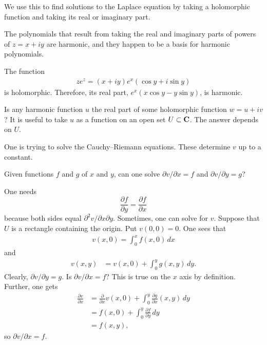 \documentclass[11pt, oneside,margin=1in]{article}
\begin{document}
We use this to find solutions to the Laplace equation by taking a holomorphic function and taking its real or imaginary part.
\begin{example}\label{}\text{}
The polynomials that result from taking the real and imaginary parts of powers of $z = x+iy$ are harmonic, and they happen to be a basis for harmonic polynomials.
\end{example}

\begin{example}[ ]\label{}\text{}
The function
\begin{align*}
	ze^z = (x+iy)e^x (\cos y + i\sin y)
\end{align*}
is holomorphic. Therefore, its real part, $e^x(x\cos y - y\sin y)$, is harmonic.
\end{example}

Is any harmonic function $u$ the real part of some holomorphic function $w = u+iv$? It is useful to take $u$ as a function on an open set $U\subset \mathbf C$. The answer depends on $U$. 

One is trying to solve the Cauchy--Riemann equations. These determine $v$ up to a constant. 

\begin{problem}
	Given functions $f$ and $g$ of $x$ and $y$, can one solve $\partial v/\partial x = f$ and $\partial v/\partial y = g$?
\end{problem}

One needs
\[
	\frac{\partial f}{\partial y} = \frac{\partial f}{\partial x}
\] 
because both sides equal $\partial^2 v/\partial x\partial y$. Sometimes, one can solve for $v$. 
Suppose that $U$ is a rectangle containing the origin. Put $v(0,0)=0$. One sees that
\begin{align*}
	v(x,0) =  \int_{0}^{x} f(x,0)   \, dx 
\end{align*}
and
\begin{align*}
	v(x,y) &= v (x,0) +  \int_{0}^{y} g(x,y)  \, dy. 
\end{align*}
Clearly, $\partial v/\partial y=g$. Is $\partial v/\partial x = f$? This is true on the $x$ axis by definition. Further, one gets
\begin{align*}
	\frac{\partial v}{\partial x} &= \frac{\partial}{\partial x} v(x,0) +  \int_{0}^{y} \frac{\partial g}{\partial x}(x,y)  \, dy\\
				      &= f(x,0) +  \int_{0}^{y} \frac{\partial f}{\partial y}  \, dy\\
				      &= f(x,y),
\end{align*}
so $\partial v/\partial x = f$.
\end{document}
